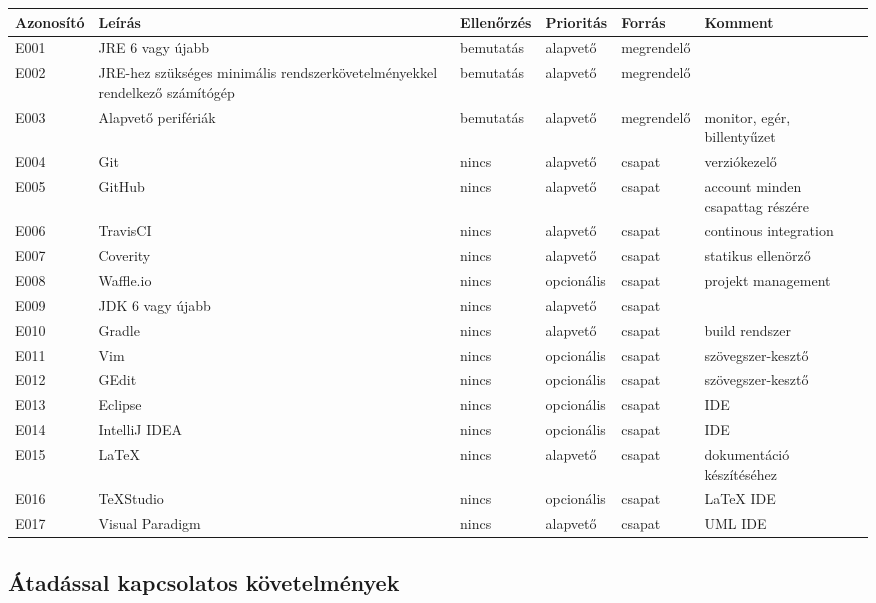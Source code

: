\begin{longtable}{| p{1.75cm} | p{3cm} | p{1.75cm} | p{1.5cm} | p{1.8cm} | p{2cm} |}
\hline
\textbf{Azonosító}   & \textbf{Leírás} & \textbf{Ellenőrzés} & \textbf{Prioritás} & \textbf{Forrás} & \textbf{Komment} \tabularnewline
\hline\hline
\endhead
E001 & JRE 6 vagy újabb & bemutatás & alapvető & megrendelő &  \tabularnewline \hline
E002 & JRE-hez szükséges minimális rendszerkövetelményekkel rendelkező számítógép & bemutatás & alapvető & megrendelő & \tabularnewline \hline
E003 & Alapvető perifériák & bemutatás & alapvető & megrendelő & monitor, egér, billentyűzet \tabularnewline \hline
E004 & Git & nincs & alapvető & csapat & verziókezelő \tabularnewline \hline
E005 & GitHub & nincs & alapvető & csapat & account minden csapattag részére  \tabularnewline \hline
E006 & TravisCI & nincs & alapvető & csapat & continous integration \tabularnewline \hline
E007 & Coverity & nincs & alapvető & csapat & statikus ellenörző \tabularnewline \hline
E008 & Waffle.io & nincs & opcionális & csapat & projekt management \tabularnewline \hline
E009 & JDK 6 vagy újabb & nincs & alapvető & csapat & \tabularnewline \hline
E010 & Gradle & nincs & alapvető & csapat & build rendszer  \tabularnewline \hline
E011 & Vim & nincs & opcionális & csapat & szövegszer-kesztő \tabularnewline \hline 
E012 & GEdit & nincs & opcionális & csapat & szövegszer-kesztő \tabularnewline \hline
E013 & Eclipse & nincs & opcionális & csapat & IDE \tabularnewline \hline
E014 & IntelliJ IDEA & nincs & opcionális & csapat & IDE \tabularnewline \hline
E015 & LaTeX & nincs & alapvető & csapat & dokumentáció készítéséhez \tabularnewline \hline
E016 & TeXStudio & nincs & opcionális & csapat & LaTeX IDE \tabularnewline \hline
E017 & Visual Paradigm & nincs & alapvető & csapat & UML IDE \tabularnewline
\hline
\end{longtable}

\subsection{Átadással kapcsolatos követelmények}

